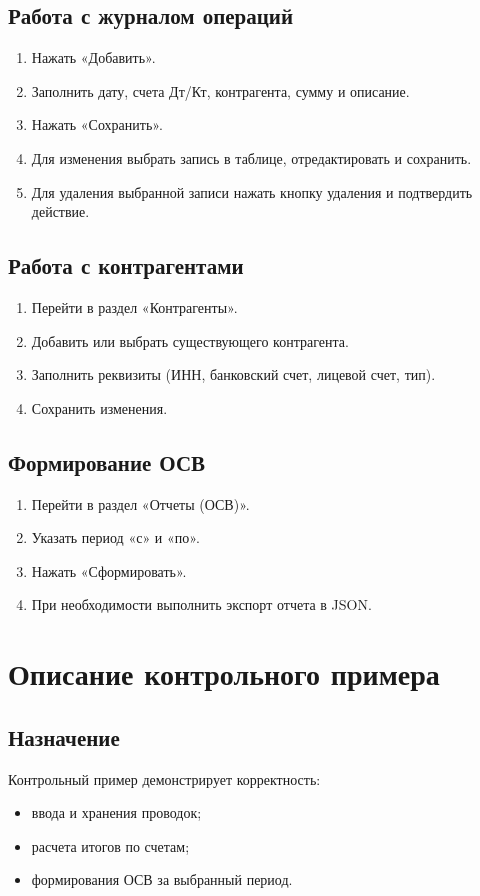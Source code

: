 \documentclass[14pt,a4paper]{extarticle}
\begin{document}
\subsection{Работа с журналом операций}
\begin{enumerate}
    \item Нажать «Добавить».
    \item Заполнить дату, счета Дт/Кт, контрагента, сумму и описание.
    \item Нажать «Сохранить».
    \item Для изменения выбрать запись в таблице, отредактировать и сохранить.
    \item Для удаления выбранной записи нажать кнопку удаления и подтвердить действие.
\end{enumerate}

\subsection{Работа с контрагентами}
\begin{enumerate}
    \item Перейти в раздел «Контрагенты».
    \item Добавить или выбрать существующего контрагента.
    \item Заполнить реквизиты (ИНН, банковский счет, лицевой счет, тип).
    \item Сохранить изменения.
\end{enumerate}

\subsection{Формирование ОСВ}
\begin{enumerate}
    \item Перейти в раздел «Отчеты (ОСВ)».
    \item Указать период «с» и «по».
    \item Нажать «Сформировать».
    \item При необходимости выполнить экспорт отчета в JSON.
\end{enumerate}

\section{Описание контрольного примера}

\subsection{Назначение}
Контрольный пример демонстрирует корректность:
\begin{itemize}
    \item ввода и хранения проводок;
    \item расчета итогов по счетам;
    \item формирования ОСВ за выбранный период.
\end{itemize}
\end{document}
